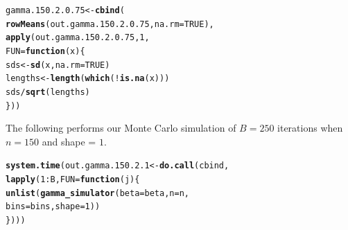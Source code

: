 \documentclass[11pt]{article}\usepackage[]{graphicx}\usepackage[]{color}
\makeatletter
\newcommand{\hlnum}[1]{\textcolor[rgb]{0.686,0.059,0.569}{#1}}%
\newcommand{\hlopt}[1]{\textcolor[rgb]{0,0,0}{#1}}%
\newcommand{\hlstd}[1]{\textcolor[rgb]{0.345,0.345,0.345}{#1}}%
\newcommand{\hlkwa}[1]{\textcolor[rgb]{0.161,0.373,0.58}{\textbf{#1}}}%
\newcommand{\hlkwb}[1]{\textcolor[rgb]{0.69,0.353,0.396}{#1}}%
\newcommand{\hlkwc}[1]{\textcolor[rgb]{0.333,0.667,0.333}{#1}}%
\newcommand{\hlkwd}[1]{\textcolor[rgb]{0.737,0.353,0.396}{\textbf{#1}}}%
\newenvironment{kframe}{%
 \def\at@end@of@kframe{}%
 \ifinner\ifhmode%
  \def\at@end@of@kframe{\end{minipage}}%
  \begin{minipage}{\columnwidth}%
 \fi\fi%
 \def\FrameCommand##1{\hskip\@totalleftmargin \hskip-\fboxsep
 \colorbox{shadecolor}{##1}\hskip-\fboxsep
     \hskip-\linewidth \hskip-\@totalleftmargin \hskip\columnwidth}%
 \MakeFramed {\advance\hsize-\width
   \@totalleftmargin\z@ \linewidth\hsize
   \@setminipage}}%
 {\par\unskip\endMakeFramed%
 \at@end@of@kframe}
\newenvironment{knitrout}{}{} %
\makeatother
\begin{document}
\begin{knitrout}
\color{fgcolor}\begin{kframe}
\begin{alltt}
\hlstd{gamma.150.2.0.75} \hlkwb{<-} \hlkwd{cbind}\hlstd{(}
  \hlkwd{rowMeans}\hlstd{(out.gamma.150.2.0.75,} \hlkwc{na.rm} \hlstd{=} \hlnum{TRUE}\hlstd{),}
  \hlkwd{apply}\hlstd{(out.gamma.150.2.0.75,} \hlnum{1}\hlstd{,}
  \hlkwc{FUN} \hlstd{=} \hlkwa{function}\hlstd{(}\hlkwc{x}\hlstd{)\{}
    \hlstd{sds} \hlkwb{<-} \hlkwd{sd}\hlstd{(x,} \hlkwc{na.rm} \hlstd{=} \hlnum{TRUE}\hlstd{)}
    \hlstd{lengths} \hlkwb{<-} \hlkwd{length}\hlstd{(}\hlkwd{which}\hlstd{(}\hlopt{!}\hlkwd{is.na}\hlstd{(x)))}
    \hlstd{sds} \hlopt{/} \hlkwd{sqrt}\hlstd{(lengths)}
  \hlstd{\}))}
\end{alltt}


{\ttfamily\noindent\bfseries\color{errorcolor}{\#\# Error in is.data.frame(x): object 'out.gamma.150.2.0.75' not found}}\end{kframe}
\end{knitrout}

The following performs our Monte Carlo simulation of $B = 250$ iterations 
when $n = 150$ and shape = $1$.

\begin{knitrout}
\color{fgcolor}\begin{kframe}
\begin{alltt}
\hlkwd{system.time}\hlstd{(out.gamma.150.2.1} \hlkwb{<-} \hlkwd{do.call}\hlstd{(cbind,}
  \hlkwd{lapply}\hlstd{(}\hlnum{1}\hlopt{:}\hlstd{B,} \hlkwc{FUN} \hlstd{=} \hlkwa{function}\hlstd{(}\hlkwc{j}\hlstd{)\{}
    \hlkwd{unlist}\hlstd{(}\hlkwd{gamma_simulator}\hlstd{(}\hlkwc{beta} \hlstd{= beta,} \hlkwc{n} \hlstd{= n,}
      \hlkwc{bins} \hlstd{= bins,} \hlkwc{shape} \hlstd{=} \hlnum{1}\hlstd{))}
\hlstd{\})))}
\end{alltt}


{\ttfamily\noindent\bfseries\color{errorcolor}{\#\# Error in eval(predvars, data, env): object 'x1' not found}}

{\ttfamily\noindent\itshape\color{messagecolor}{\#\# Timing stopped at: 0.003 0 0.003}}\end{kframe}
\end{knitrout}
\end{document}

